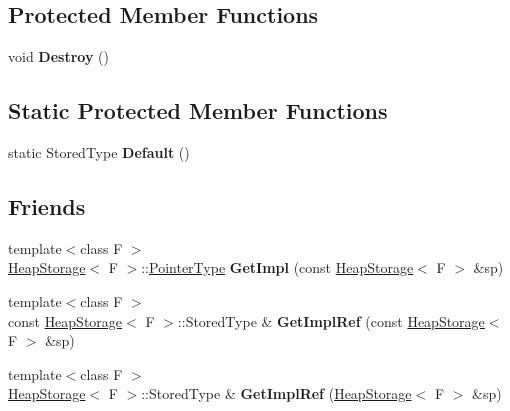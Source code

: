 \subsection*{Protected Member Functions}
\begin{DoxyCompactItemize}
\item 
\hypertarget{classLoki_1_1HeapStorage_abf6f397d8ca3719755818e2f466eb4e9}{}void {\bfseries Destroy} ()\label{classLoki_1_1HeapStorage_abf6f397d8ca3719755818e2f466eb4e9}

\end{DoxyCompactItemize}
\subsection*{Static Protected Member Functions}
\begin{DoxyCompactItemize}
\item 
\hypertarget{classLoki_1_1HeapStorage_a8b653461f76ec643051c652300a77878}{}static Stored\+Type {\bfseries Default} ()\label{classLoki_1_1HeapStorage_a8b653461f76ec643051c652300a77878}

\end{DoxyCompactItemize}
\subsection*{Friends}
\begin{DoxyCompactItemize}
\item 
\hypertarget{classLoki_1_1HeapStorage_a3b756cd4f9bf8868ebfb5817f2ea7210}{}{\footnotesize template$<$class F $>$ }\\\hyperlink{classLoki_1_1HeapStorage}{Heap\+Storage}$<$ F $>$\+::\hyperlink{classLoki_1_1HeapStorage_a11ad403d98af5c6671f47d433d67201d}{Pointer\+Type} {\bfseries Get\+Impl} (const \hyperlink{classLoki_1_1HeapStorage}{Heap\+Storage}$<$ F $>$ \&sp)\label{classLoki_1_1HeapStorage_a3b756cd4f9bf8868ebfb5817f2ea7210}

\item 
\hypertarget{classLoki_1_1HeapStorage_a60a610b0ff14d2775c554b6d43dcf696}{}{\footnotesize template$<$class F $>$ }\\const \hyperlink{classLoki_1_1HeapStorage}{Heap\+Storage}$<$ F $>$\+::Stored\+Type \& {\bfseries Get\+Impl\+Ref} (const \hyperlink{classLoki_1_1HeapStorage}{Heap\+Storage}$<$ F $>$ \&sp)\label{classLoki_1_1HeapStorage_a60a610b0ff14d2775c554b6d43dcf696}

\item 
\hypertarget{classLoki_1_1HeapStorage_a9e3d85d08849d33a3293441c394b20b7}{}{\footnotesize template$<$class F $>$ }\\\hyperlink{classLoki_1_1HeapStorage}{Heap\+Storage}$<$ F $>$\+::Stored\+Type \& {\bfseries Get\+Impl\+Ref} (\hyperlink{classLoki_1_1HeapStorage}{Heap\+Storage}$<$ F $>$ \&sp)\label{classLoki_1_1HeapStorage_a9e3d85d08849d33a3293441c394b20b7}

\end{DoxyCompactItemize}


